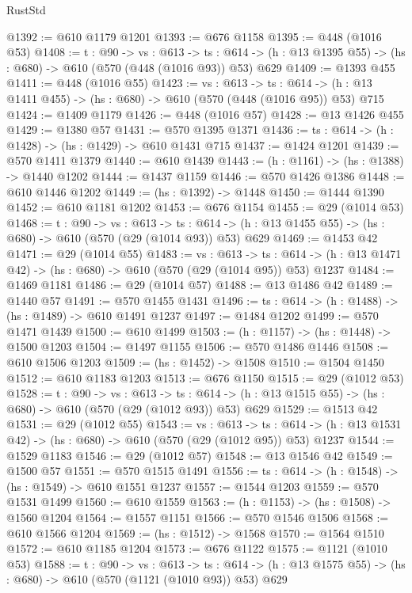 \begin{lexlean}{RustStd}
\begin{coremodule}
@1392 := @610 @1179 @1201
@1393 := @676 @1158
@1395 := @448 (@1016 @53)
@1408 := {t : @90} ->
  {vs : @613} ->
  {ts : @614} -> (h : @13 @1395 @55) -> (hs : @680) -> @610 (@570 (@448 (@1016 @93)) @53) @629
@1409 := @1393 @455
@1411 := @448 (@1016 @55)
@1423 := {vs : @613} ->
  {ts : @614} -> (h : @13 @1411 @455) -> (hs : @680) -> @610 (@570 (@448 (@1016 @95)) @53) @715
@1424 := @1409 @1179
@1426 := @448 (@1016 @57)
@1428 := @13 @1426 @455
@1429 := @1380 @57
@1431 := @570 @1395 @1371
@1436 := {ts : @614} -> (h : @1428) -> (hs : @1429) -> @610 @1431 @715
@1437 := @1424 @1201
@1439 := @570 @1411 @1379
@1440 := @610 @1439
@1443 := (h : @1161) -> (hs : @1388) -> @1440 @1202
@1444 := @1437 @1159
@1446 := @570 @1426 @1386
@1448 := @610 @1446 @1202
@1449 := (hs : @1392) -> @1448
@1450 := @1444 @1390
@1452 := @610 @1181 @1202
@1453 := @676 @1154
@1455 := @29 (@1014 @53)
@1468 := {t : @90} ->
  {vs : @613} ->
  {ts : @614} -> (h : @13 @1455 @55) -> (hs : @680) -> @610 (@570 (@29 (@1014 @93)) @53) @629
@1469 := @1453 @42
@1471 := @29 (@1014 @55)
@1483 := {vs : @613} ->
  {ts : @614} -> (h : @13 @1471 @42) -> (hs : @680) -> @610 (@570 (@29 (@1014 @95)) @53) @1237
@1484 := @1469 @1181
@1486 := @29 (@1014 @57)
@1488 := @13 @1486 @42
@1489 := @1440 @57
@1491 := @570 @1455 @1431
@1496 := {ts : @614} -> (h : @1488) -> (hs : @1489) -> @610 @1491 @1237
@1497 := @1484 @1202
@1499 := @570 @1471 @1439
@1500 := @610 @1499
@1503 := (h : @1157) -> (hs : @1448) -> @1500 @1203
@1504 := @1497 @1155
@1506 := @570 @1486 @1446
@1508 := @610 @1506 @1203
@1509 := (hs : @1452) -> @1508
@1510 := @1504 @1450
@1512 := @610 @1183 @1203
@1513 := @676 @1150
@1515 := @29 (@1012 @53)
@1528 := {t : @90} ->
  {vs : @613} ->
  {ts : @614} -> (h : @13 @1515 @55) -> (hs : @680) -> @610 (@570 (@29 (@1012 @93)) @53) @629
@1529 := @1513 @42
@1531 := @29 (@1012 @55)
@1543 := {vs : @613} ->
  {ts : @614} -> (h : @13 @1531 @42) -> (hs : @680) -> @610 (@570 (@29 (@1012 @95)) @53) @1237
@1544 := @1529 @1183
@1546 := @29 (@1012 @57)
@1548 := @13 @1546 @42
@1549 := @1500 @57
@1551 := @570 @1515 @1491
@1556 := {ts : @614} -> (h : @1548) -> (hs : @1549) -> @610 @1551 @1237
@1557 := @1544 @1203
@1559 := @570 @1531 @1499
@1560 := @610 @1559
@1563 := (h : @1153) -> (hs : @1508) -> @1560 @1204
@1564 := @1557 @1151
@1566 := @570 @1546 @1506
@1568 := @610 @1566 @1204
@1569 := (hs : @1512) -> @1568
@1570 := @1564 @1510
@1572 := @610 @1185 @1204
@1573 := @676 @1122
@1575 := @1121 (@1010 @53)
@1588 := {t : @90} ->
  {vs : @613} ->
  {ts : @614} -> (h : @13 @1575 @55) -> (hs : @680) -> @610 (@570 (@1121 (@1010 @93)) @53) @629

\end{coremodule}
\end{lexlean}
